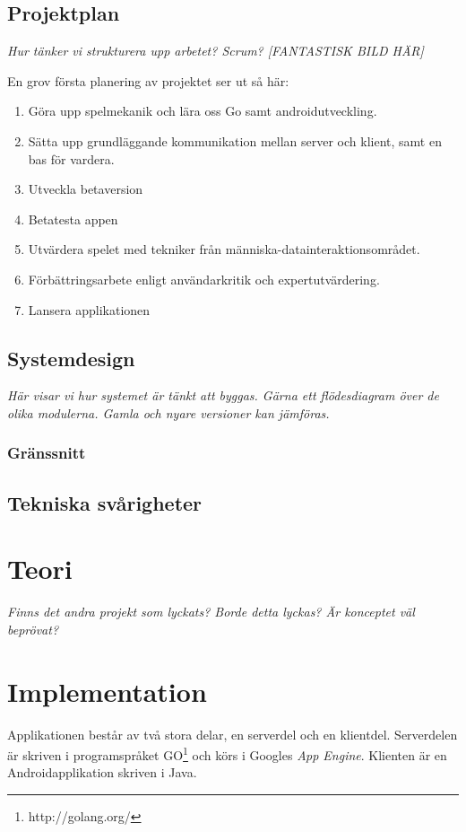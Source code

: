 \documentclass[11pt,a4paper]{article}
\begin{document}
\subsection{Projektplan}

\textit{Hur tänker vi strukturera upp arbetet? Scrum?
[FANTASTISK BILD HÄR]}

En grov första planering av projektet ser ut så här:
\begin{enumerate}
\item Göra upp spelmekanik och lära oss Go samt androidutveckling.
\item Sätta upp grundläggande kommunikation mellan server och klient, samt en bas för vardera.
\item Utveckla betaversion
\item Betatesta appen
\item Utvärdera spelet med tekniker från människa-datainteraktionsområdet.
\item Förbättringsarbete enligt användarkritik och expertutvärdering.
\item Lansera applikationen
\end{enumerate}

\subsection{Systemdesign}
\textit{Här visar vi hur systemet är tänkt att byggas. Gärna ett flödesdiagram över de olika modulerna. Gamla och nyare versioner kan jämföras.}

\subsubsection{Gränssnitt}

\subsection{Tekniska svårigheter}


\section{Teori}
\textit{Finns det andra projekt som lyckats? Borde detta lyckas? Är konceptet väl beprövat?}


\section{Implementation}
Applikationen består av två stora delar, en serverdel och en klientdel. Serverdelen är skriven i programspråket GO\footnote{http://golang.org/} och körs i Googles \textit{App Engine}. Klienten är en Androidapplikation skriven i Java.
\end{document}
